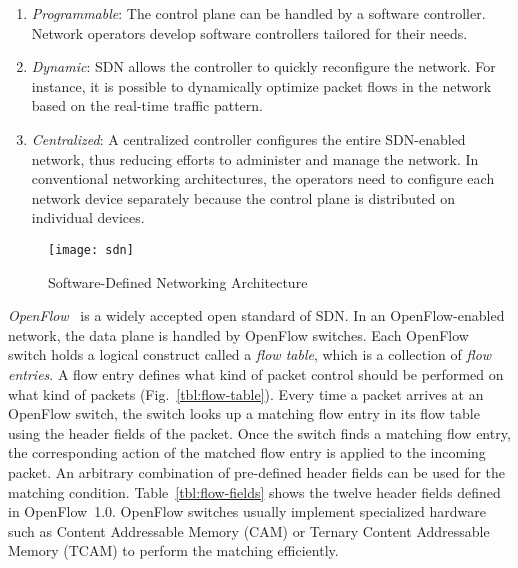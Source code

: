 \begin{enumerate}
\item
  \emph{Programmable}: The control plane can be handled by a software
  controller. Network operators develop software controllers tailored for
  their needs.
\item
  \emph{Dynamic}: SDN allows the controller to quickly reconfigure the
  network. For instance, it is possible to dynamically optimize packet
  flows in the network based on the real-time traffic pattern.
\item
  \emph{Centralized}: A centralized controller configures the entire
  SDN-enabled network, thus reducing efforts to administer and manage
  the network. In conventional networking architectures, the operators
  need to configure each network device separately because the control
  plane is distributed on individual devices.
\end{enumerate}

\begin{figure}
    \centering
    \texttt{[image: sdn]}
    \caption{Software-Defined Networking Architecture}%
    \label{fig:sdn-architecture}
\end{figure}

\emph{OpenFlow}~\autocite{McKeown2008} is a widely accepted open standard of
SDN\@. In an OpenFlow-enabled network, the data plane is handled by OpenFlow
switches. Each OpenFlow switch holds a logical construct called a \emph{flow
table}, which is a collection of \emph{flow entries}. A flow entry defines
what kind of packet control should be performed on what kind of packets
(Fig.~\ref{tbl:flow-table}). Every time a packet arrives at an OpenFlow
switch, the switch looks up a matching flow entry in its flow table using the
header fields of the packet. Once the switch finds a matching flow entry, the
corresponding action of the matched flow entry is applied to the incoming
packet. An arbitrary combination of pre-defined header fields can be used for
the matching condition. Table~\ref{tbl:flow-fields} shows the twelve header
fields defined in OpenFlow~1.0. OpenFlow switches usually implement
specialized hardware such as Content Addressable Memory (CAM) or Ternary
Content Addressable Memory (TCAM) to perform the matching efficiently.

